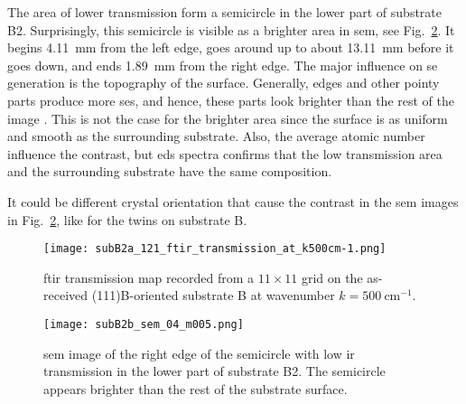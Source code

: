 The area of lower transmission form a semicircle in the lower part of substrate B2. Surprisingly, this semicircle is visible as a brighter area in \ac{sem}, see Fig.~\ref{fig:subB2b_sem_low_transmission}. It begins \SI{4.11}{\milli\metre} from the left edge, goes around up to about \SI{13.11}{\milli\metre} before it goes down, and ends \SI{1.89}{\milli\metre} from the right edge. The major influence on \ac{se} generation is the topography of the surface. Generally, edges and other pointy parts produce more \acp{se}, and hence, these parts look brighter than the rest of the image \citep{goldstein2012scanning}. This is not the case for the brighter area since the surface is as uniform and smooth as the surrounding substrate. Also, the average atomic number influence the contrast, but \ac{eds} spectra confirms that the low transmission area and the surrounding substrate have the same composition.

It could be different crystal orientation that cause the contrast in the \ac{sem} images in Fig.~\ref{fig:subB2b_sem_low_transmission}, like for the twins on substrate B. 

\begin{figure}[htbp]
    \centering
    \texttt{[image: subB2a\_121\_ftir\_transmission\_at\_k500cm-1.png]}
    \caption[\Ac{ftir} transmission map for the as-received substrate B at $k=\SI{500}{\centi\metre^{-1}}$.]{\Acf{ftir} transmission map recorded from a $11\times11$ grid on the as-received (111)B-oriented substrate B at wavenumber $k=\SI{500}{\centi\metre^{-1}}$.}
    \label{fig:subB2a_ftir_map_500cm-1}
\end{figure}

\begin{figure}
    \centering
    \texttt{[image: subB2b\_sem\_04\_m005.png]}
    \caption[]{\Ac{sem} image of the right edge of the semicircle with low \ac{ir} transmission in the lower part of substrate B2. The semicircle appears brighter than the rest of the substrate surface.}\label{fig:subB2b_sem_low_transmission}
\end{figure}


